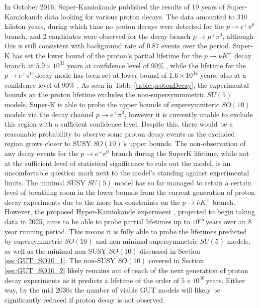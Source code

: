 \documentclass{article}
\begin{document}
In October 2016, Super-Kamiokande published the results of 19 years of Super-Kamiokande data looking for various proton decays. The data amounted to 310 kiloton years,  during which time no proton decays were detected for the $p\rightarrow e^+ \pi^0$ branch, and 2 candidates were observed for the decay branch $p\rightarrow \mu^+ \pi^0$, although this is still consistent with background rate of $0.87$ events over the period\cite{SuperK2016}. Super-K has set the lower bound of the proton's partial lifetime for the $p\rightarrow \overline{\nu}K^+$ decay branch at $5.9\times10^{33}$ years at confidence level of $90\%$ \cite{SuperK2014}, while the lifetime for the $p\rightarrow e^+ \pi^0$ decay mode has been set at lower bound of $1.6\times10^{34}$ years, also at a confidence level of $90\%$ \cite{SuperK2016}. 
As seen in Table \ref{table:protonDecay}, the experimental bounds on the proton lifetime excludes the non-supersymmmetric $SU(5)$ models. Super-K is able to probe the upper bounds of supersymmteric $SO(10)$ models via the decay channel $p\rightarrow e^+ \pi^0$, however it is currently unable to exclude this region with a sufficient confidence level. Despite this, there would be a reasonable probability to observe some proton decay events as the excluded region grows closer to SUSY $SO(10)$'s upper bounds. The non-observation of any decay events for the $p\rightarrow e^+ \pi^0$ branch during the SuperK lifetime, while not at the sufficient level of statistical significance to rule out the model, is an uncomfortable question mark next to the model's standing against experimental limits.
The minimal SUSY $SU(5)$ model has so far managed to retain a certain level of breathing room in the lower bounds from the current generation of proton decay experiments due to the more lax constraints on the $p\rightarrow \overline{\nu}K^+$ branch. However, the  proposed Hyper-Kamiokande experiment \cite{HyperK}, projected to begin taking data in 2025, aims to be able to probe partial lifetimes up to $10^{35}\,$years over an 8 year running period. This means it is fully able to probe the lifetimes predicted by supersymmetric $SO(10)$ and non-minimal supersymmetric $SU(5)$ models, as well as the minimal non-SUSY $SO(10)$ discussed in Section \ref{sec:GUT_SO10_1}. The non-SUSY $SO(10)$ covered in Section \ref{sec:GUT_SO10_2} likely remains out of reach of the next generation of proton decay experiments as it predicts a lifetime of the order of $5\times10^{36}\,$years. Either way, by the mid 2030s the number of viable GUT models will likely be significantly reduced if proton decay is not observed.
\end{document}
